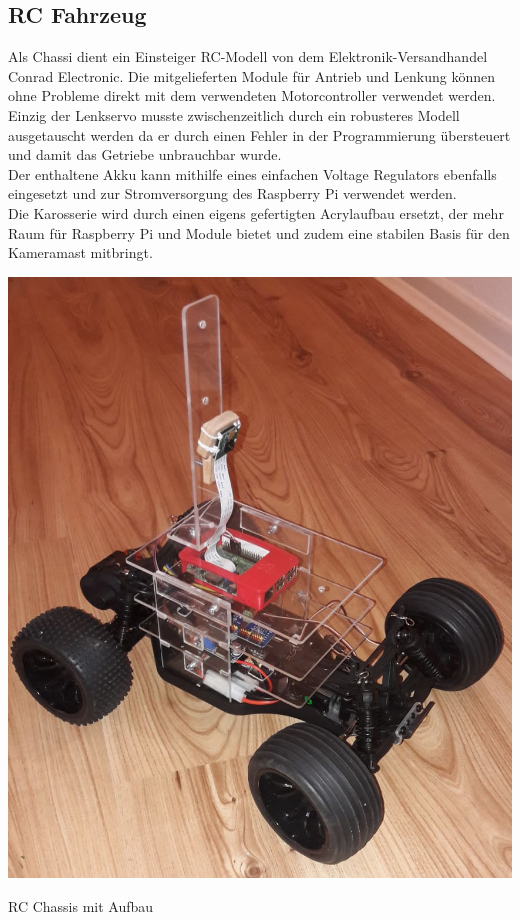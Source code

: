   \subsection{RC Fahrzeug}

    Als Chassi dient ein Einsteiger RC-Modell von dem Elektronik-Versandhandel
    Conrad Electronic. Die mitgelieferten Module für Antrieb und Lenkung können
    ohne Probleme direkt mit dem verwendeten Motorcontroller verwendet werden.
    Einzig der Lenkservo musste zwischenzeitlich durch ein robusteres Modell 
    ausgetauscht werden da er durch einen Fehler in der Programmierung
    übersteuert und damit das Getriebe unbrauchbar wurde. \\
    Der enthaltene Akku kann mithilfe eines einfachen Voltage Regulators
    ebenfalls eingesetzt und zur Stromversorgung des Raspberry Pi verwendet
    werden. \\
    Die Karosserie wird durch einen eigens gefertigten Acrylaufbau ersetzt, der
    mehr Raum für Raspberry Pi und Module bietet und zudem eine stabilen Basis
    für den Kameramast mitbringt.
    \ \\
    \begin{minipage}{\columnwidth}
      \makeatletter
      \def\@captype{figure}
      \makeatother
      \centering
      \includegraphics[width=0.6\linewidth]{images/hw_setup.jpg}
      \caption{RC Chassis mit Aufbau}
      \label{fig:img-hw-05}
    \end{minipage}
    \vspace{1cm}

